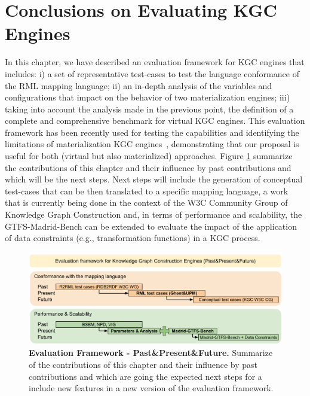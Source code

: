 \section{Conclusions on Evaluating KGC Engines}
In this chapter, we have described an evaluation framework for KGC engines that includes: i) a set of representative test-cases to test the language conformance of the RML mapping language; ii) an in-depth analysis of the variables and configurations that impact on the behavior of two materialization engines; iii) taking into account the analysis made in the previous point, the definition of a complete and comprehensive benchmark for virtual KGC engines. This evaluation framework has been recently used for testing the capabilities and identifying the limitations of materialization KGC engines~\citep{arenas2021knowledge}, demonstrating that our proposal is useful for both (virtual but also materialized) approaches. Figure \ref{fig:eval-framework} summarize the contributions of this chapter and their influence by past contributions and which will be the next steps. Next steps will include the generation of conceptual test-cases that can be then translated to a specific mapping language, a work that is currently being done in the context of the W3C Community Group of Knowledge Graph Construction and, in terms of performance and scalability, the GTFS-Madrid-Bench can be extended to evaluate the impact of the application of data constraints (e.g., transformation functions) in a KGC process.

\begin{figure}
    \centering
    \includegraphics[angle=90,width=0.5\linewidth]{figures/Evaluation Framework.pdf}
    \caption[Evaluation Framework - Past\&Present\&Future]{\textbf{Evaluation Framework - Past\&Present\&Future.} Summarize of the contributions of this chapter and their influence by past contributions and which are going the expected next steps for a include new features in a new version of the evaluation framework.}
    \label{fig:eval-framework}
\end{figure}